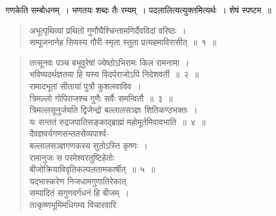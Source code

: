 \documentclass[11pt, openany]{book}
\begin{document}
गणकेति सम्बोधनम्~। भणतयः शब्दः तैः रम्यम्~। पदलालित्यत्युक्तमित्यर्थः~। शेषं स्पष्टम~॥ 
\begin{quote}
    \bs
 अभूत्पृथिव्यां प्रथितो गुणौघैश्चिन्तामणिर्दैवविदां वरिष्ठः~। \\
 सम्पूजनानेह सियस्य गौरी स्मृता स्तुता प्रत्यहमाविरासीत्~॥~१~॥
\end{quote}

\newpage
\begin{quote}
    \bs
 तत्सूनवः पञ्च बभूवुरेषां ज्येष्ठोऽभिरामः किल रामनामा~। \\
 भविष्यदर्थज्ञतया हि यस्य विदर्पराजोऽपि निदेशवर्ती~॥~२~॥~\\

 \vspace{-5mm}
 रामादभूतां सीतायां पुत्रौ कुशलवाविव~। \\
 त्रिमल्लो गोपिराजश्च गुणैः सर्वैः समन्वितौ~॥~३~॥\\

 \vspace{-5mm}
 त्रिमल्लसूनुर्जयति द्विजेन्द्रो बल्लालसञ्ज्ञः शितिकण्ठभक्तः~। \\
 यः सन्ततं रुद्रजपातिसङ्काद्ब्राह्मं महोमूर्तमिवावभाति~॥~४~॥\\

\vspace{-5mm}
 दैवज्ञवर्यगणसन्ततसेव्यपार्श्व- \\

\vspace{-7mm}
\hspace{1cm} बल्लालसञ्ज्ञगणकस्य सुतोऽस्ति कृष्णः~। \\

\vspace{-7mm}
 रामानुजः स परमेश्वरतुष्टिहेतोः \\

\vspace{-7mm}
\hspace{1cm} बीजोक्रियाविवृतिकल्पलतामकार्षीत्~॥~५~॥\\

\vspace{-5mm}
 यद्भास्करेण निजधामगुणातिरेकात् \\

\vspace{-7mm}
\hspace{1cm} सम्पादितं सगुणवर्गधनं हि बीजम्~। \\

\vspace{-7mm}
 तत्कृष्णभूमिमधिगम्य विचारवारि \\


\end{quote}
\end{document}
